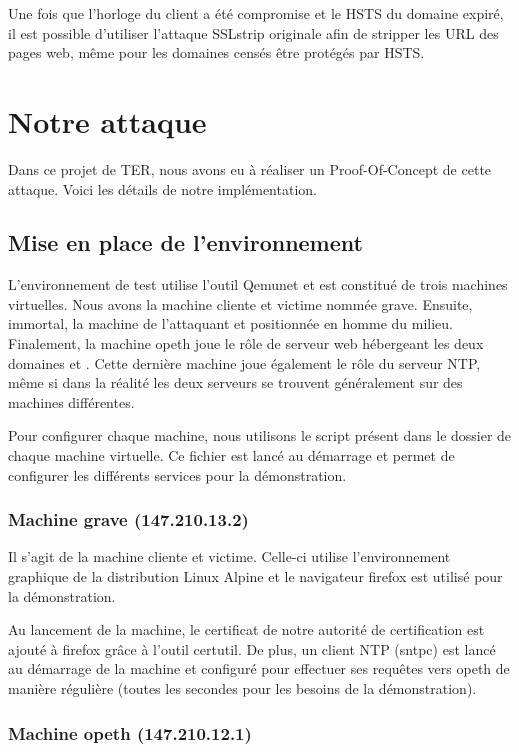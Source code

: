 Une fois que l'horloge du client a été compromise et le HSTS du domaine expiré, il est possible d'utiliser l'attaque SSLstrip originale afin de stripper les URL des pages web, même pour les domaines censés être protégés par HSTS.

\section{Notre attaque}

Dans ce projet de TER, nous avons eu à réaliser un Proof-Of-Concept de cette attaque. Voici les détails de notre implémentation.

\subsection{Mise en place de l'environnement}

L'environnement de test utilise l'outil Qemunet et est constitué de trois machines virtuelles. Nous avons la machine cliente et victime nommée grave. Ensuite, immortal, la machine de l'attaquant et positionnée en homme du milieu. Finalement, la machine opeth joue le rôle de serveur web hébergeant les deux domaines  et . Cette dernière machine joue également le rôle du serveur NTP, même si dans la réalité les deux serveurs se trouvent généralement sur des machines différentes.

Pour configurer chaque machine, nous utilisons le script  présent dans le dossier de chaque machine virtuelle. Ce fichier est lancé au démarrage et permet de configurer les différents services pour la démonstration.

\subsubsection{Machine grave (147.210.13.2)}

Il s'agit de la machine cliente et victime. Celle-ci utilise l'environnement graphique de la distribution Linux Alpine et le navigateur firefox est utilisé pour la démonstration.

Au lancement de la machine, le certificat de notre autorité de certification est ajouté à firefox grâce à l'outil certutil. De plus, un client NTP (sntpc) est lancé au démarrage de la machine et configuré pour effectuer ses requêtes vers opeth de manière régulière (toutes les secondes pour les besoins de la démonstration).

\subsubsection{Machine opeth (147.210.12.1)}

